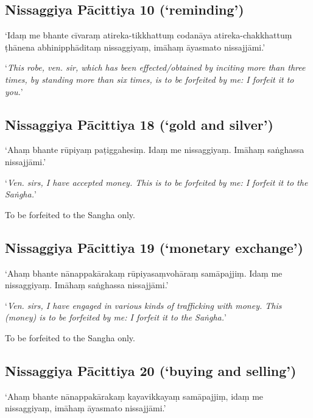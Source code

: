 
\subsection{Nissaggiya Pācittiya 10 (‘reminding’)}

‘Idaṃ me bhante cīvaraṃ atireka-tikkhattuṃ codanāya atireka-chakkhattuṃ ṭhānena
abhinipphāditaṃ nissaggiyaṃ, imāhaṃ āyasmato nissajjāmi.’

‘\emph{This robe, ven. sir, which has been effected/obtained by inciting more
  than three times, by standing more than six times, is to be forfeited by me: I
  forfeit it to you.}’ 


\subsection{Nissaggiya Pācittiya 18 (‘gold and silver’)}

‘Ahaṃ bhante rūpiyaṃ paṭiggahesiṃ. Idaṃ me nissaggiyaṃ. Imāhaṃ saṅghassa
nissajjāmi.’

‘\emph{Ven. sirs, I have accepted money. This is to be forfeited by me: I
  forfeit it to the Saṅgha.}’

To be forfeited to the Sangha only. 

\subsection{Nissaggiya Pācittiya 19 (‘monetary exchange’)}

‘Ahaṃ bhante nānappakārakaṃ rūpiyasaṃvohāraṃ samāpajjiṃ. Idaṃ me nissaggiyaṃ.
Imāhaṃ saṅghassa nissajjāmi.’

‘\emph{Ven. sirs, I have engaged in various kinds of trafficking with money.
  This (money) is to be forfeited by me: I forfeit it to the Saṅgha.}’

To be forfeited to the Sangha only. 

\subsection{Nissaggiya Pācittiya 20 (‘buying and selling’)}

‘Ahaṃ bhante nānappakārakaṃ kayavikkayaṃ samāpajjiṃ, idaṃ me nissaggiyaṃ, imāhaṃ
āyasmato nissajjāmi.’

